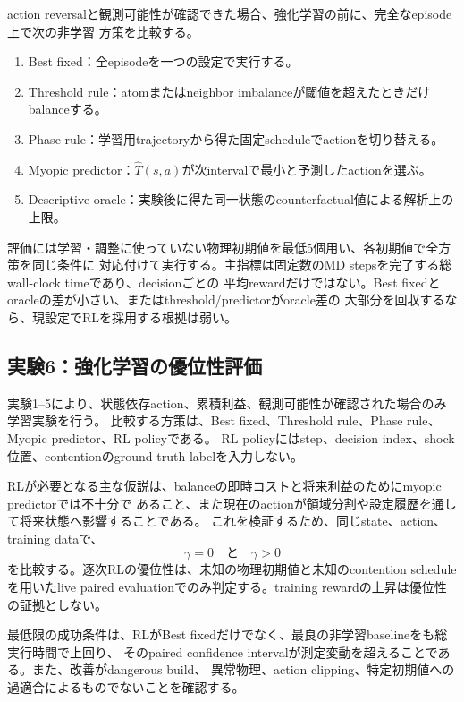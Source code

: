 action reversalと観測可能性が確認できた場合、強化学習の前に、完全なepisode上で次の非学習
方策を比較する。
\begin{enumerate}
  \item Best fixed：全episodeを一つの設定で実行する。
  \item Threshold rule：atomまたはneighbor imbalanceが閾値を超えたときだけbalanceする。
  \item Phase rule：学習用trajectoryから得た固定scheduleでactionを切り替える。
  \item Myopic predictor：$\widehat{T}(s,a)$が次intervalで最小と予測したactionを選ぶ。
  \item Descriptive oracle：実験後に得た同一状態のcounterfactual値による解析上の上限。
\end{enumerate}

評価には学習・調整に使っていない物理初期値を最低5個用い、各初期値で全方策を同じ条件に
対応付けて実行する。主指標は固定数のMD stepsを完了する総wall-clock timeであり、decisionごとの
平均rewardだけではない。Best fixedとoracleの差が小さい、またはthreshold/predictorがoracle差の
大部分を回収するなら、現設定でRLを採用する根拠は弱い。

\subsection{実験6：強化学習の優位性評価}

実験1--5により、状態依存action、累積利益、観測可能性が確認された場合のみ学習実験を行う。
比較する方策は、Best fixed、Threshold rule、Phase rule、Myopic predictor、RL policyである。
RL policyにはstep、decision index、shock位置、contentionのground-truth labelを入力しない。

RLが必要となる主な仮説は、balanceの即時コストと将来利益のためにmyopic predictorでは不十分で
あること、また現在のactionが領域分割や設定履歴を通して将来状態へ影響することである。
これを検証するため、同じstate、action、training dataで、
\begin{equation}
 \gamma=0
 \quad\text{と}\quad
 \gamma>0
\end{equation}
を比較する。逐次RLの優位性は、未知の物理初期値と未知のcontention scheduleを用いたlive paired
evaluationでのみ判定する。training rewardの上昇は優位性の証拠としない。

最低限の成功条件は、RLがBest fixedだけでなく、最良の非学習baselineをも総実行時間で上回り、
そのpaired confidence intervalが測定変動を超えることである。また、改善がdangerous build、
異常物理、action clipping、特定初期値への過適合によるものでないことを確認する。

